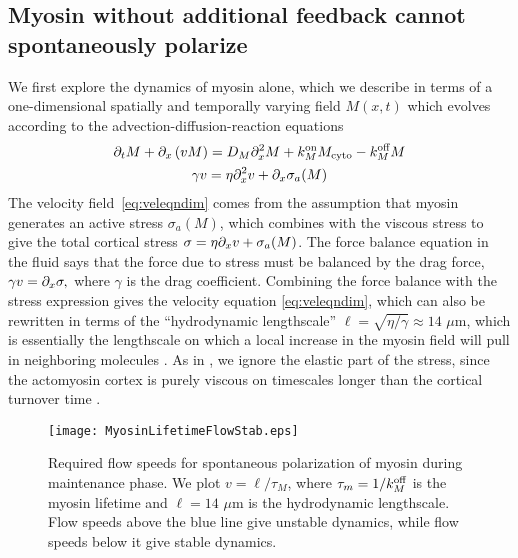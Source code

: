 \documentclass[11pt]{article}
\newcommand{\6}[1]{#1_{\text{6}}}
\newcommand{\3}[1]{#1_{\text{3}}}
\newcommand{\My}[1]{#1_M}
\begin{document}
\subsection{Myosin without additional feedback cannot spontaneously polarize \label{sec:myosin}}
We first explore the dynamics of myosin alone, which we describe in terms of a one-dimensional spatially and temporally varying field $M(x,t)$ which evolves according to the advection-diffusion-reaction equations \cite{bois2011pattern}
\begin{subequations}
\label{eq:MyOnly}
\begin{gather}
\Dt M + \Dx \left(v M\right) = D_M \Dx^2 M +\My{\kon}M_\text{cyto} - \My{\koff} M \\
\label{eq:veleqndim}
\gamma v = \eta \Dx^2 v + \Dx \sigma_a(M)
\end{gather}
\end{subequations}
The velocity field\ \eqref{eq:veleqndim} comes from the assumption that myosin generates an active stress $\sigma_a(M)$, which combines with the viscous stress to give the total cortical stress $\sigma = \eta \partial_x{v} + \sigma_a(M)$. The force balance equation in the fluid says that the force due to stress must be balanced by the drag force, $\gamma v = \partial_x \sigma,$
where $\gamma$ is the drag coefficient. Combining the force balance with the stress expression gives the velocity equation \eqref{eq:veleqndim}, which can also be rewritten in terms of the ``hydrodynamic lengthscale'' $\ell=\sqrt{\eta/\gamma} \approx 14$ $\mu$m, which is essentially the lengthscale on which a local increase in the myosin field will pull in neighboring molecules  \cite{mayer2010anisotropies}. As in \cite{bois2011pattern}, we ignore the elastic part of the stress, since the actomyosin cortex is purely viscous on timescales longer than the cortical turnover time \cite{mayer2010anisotropies}. 

\begin{figure}
\centering
\texttt{[image: MyosinLifetimeFlowStab.eps]}
\caption{\label{fig:DispRelMy}Required flow speeds for spontaneous polarization of myosin during maintenance phase. We plot $v= \ell/\tau_M$, where $\tau_m=1/k^\text{off}_M$ is the myosin lifetime and $\ell=14$ $\mu$m is the hydrodynamic lengthscale. Flow speeds above the blue line give unstable dynamics, while flow speeds below it give stable dynamics.}
\end{figure}
\end{document}
